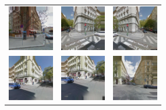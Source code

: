 \documentclass[border={5pt 1pt 5pt 5pt}, varwidth=38em]{standalone}
\begin{document}
\setlength{\tabcolsep}{0.1em}
{
\renewcommand{\arraystretch}{0.5}

\begin{table}[ht]
\centering
\begin{tabular}{ccc}
\includegraphics[width=20mm]{imgs_for_table/expanded/0001_8.jpg} & \includegraphics[width=20mm]{imgs_for_table/expanded/0005_16.jpg} & \includegraphics[width=20mm]{imgs_for_table/expanded/0005_17.jpg}\\
\newline
\includegraphics[width=20mm]{imgs_for_table/expanded/0009_10.jpg} & \includegraphics[width=20mm]{imgs_for_table/expanded/0009_11.jpg} & \includegraphics[width=20mm]{imgs_for_table/expanded/0009_13.jpg}\\
\end{tabular}
\end{table}

}
\end{document}
